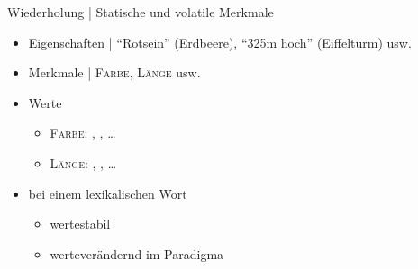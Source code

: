 \begin{frame}
  {Wiederholung | Statische und volatile Merkmale}
  \pause
  \begin{itemize}[<+->]
    \item Eigenschaften | "`Rotsein"' (Erdbeere), "`325m hoch"' (Eiffelturm) usw.
    \item Merkmale | \alert{\textsc{Farbe}}, \alert{\textsc{Länge}} usw.
    \item Werte
      \begin{itemize}[<+->]
        \item \alert{\textsc{Farbe}}: , , \ldots
        \item \alert{\textsc{Länge}}: \rot{\textit{3cm}}, , \ldots
      \end{itemize}
  \end{itemize}
  \pause
  \Halbzeile 
  \begin{exe}
    \ex
    \begin{xlist}
      \pause
      \pause
    \end{xlist}
  \end{exe}
  \Halbzeile
  \pause
  \begin{itemize}[<+->]
    \item bei einem lexikalischen Wort
      \begin{itemize}
        \item {} wertestabil
        \item {} werteverändernd im Paradigma
      \end{itemize}
  \end{itemize}
\end{frame}

